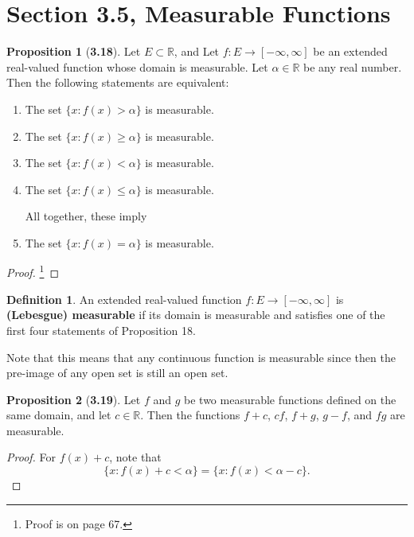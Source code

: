 \documentclass[12pt]{article}
\newcommand{\R}{\mathbb{R}}
\theoremstyle{definition}
\newtheorem*{definition}{Definition}
\newtheorem*{prop}{Proposition}
\begin{document}
\section*{Section 3.5, Measurable Functions}

\begin{prop}[\textbf{3.18}]

    Let \( E \subset \R\), and Let \( f: E \to [-\infty, \infty] \) be an extended real-valued function whose domain is measurable. Let \( \alpha \in \R \) be any real number. Then the following statements are equivalent:

    \begin{enumerate}[label = (\roman{*})]
        
        \item The set \( \{ x: f(x) > \alpha \} \) is measurable.
        \item The set \( \{ x: f(x) \geq \alpha \} \) is measurable. 
        \item The set \( \{ x: f(x) < \alpha \} \) is measurable. 
        \item The set \( \{ x: f(x) \leq \alpha \} \) is measurable. 
        
        \noindent All together, these imply

        \item The set \( \{ x: f(x) = \alpha \} \) is measurable. 
    \end{enumerate}

        \begin{proof}\footnote{Proof is on page 67.}
            
        \end{proof}

    
\end{prop}

\begin{definition}
     An extended real-valued function \( f: E \to [-\infty, \infty] \) is \textbf{(Lebesgue) measurable} if its domain is measurable and satisfies one of the first four statements of Proposition 18.
\end{definition}

Note that this means that any continuous function is measurable since then the pre-image of any open set is still an open set. 

\begin{prop}[\textbf{3.19}]
    
    Let \(f \) and \( g \) be two measurable functions defined on the same domain, and let \( c \in \R \). Then the functions \( f + c \), \( cf \), \( f + g \), \( g - f \), and \( fg \) are measurable.

        \begin{proof}
            For \( f(x) + c \), note that 
                \[
                    \{ x: f(x) + c < \alpha \} = \{ x: f(x) < \alpha - c \}.    
                \]
        \end{proof}
    
\end{prop}
\end{document}
